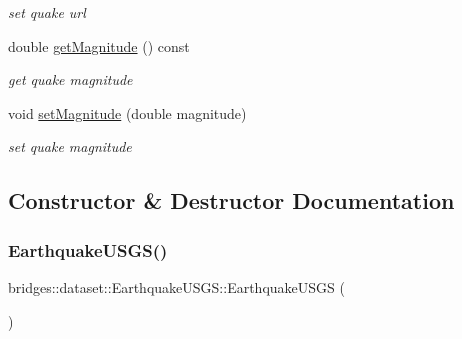 \begin{DoxyCompactItemize}
\begin{DoxyCompactList}\small\item\em set quake url \end{DoxyCompactList}\item 
double \mbox{\hyperlink{classbridges_1_1dataset_1_1_earthquake_u_s_g_s_aeb1be6b0dece1240da3123db9f9c2d9b}{get\+Magnitude}} () const
\begin{DoxyCompactList}\small\item\em get quake magnitude \end{DoxyCompactList}\item 
void \mbox{\hyperlink{classbridges_1_1dataset_1_1_earthquake_u_s_g_s_ab961fcafd63f3ec0626ff38e2c4c01cd}{set\+Magnitude}} (double magnitude)
\begin{DoxyCompactList}\small\item\em set quake magnitude \end{DoxyCompactList}\end{DoxyCompactItemize}


\subsection{Constructor \& Destructor Documentation}
\mbox{\label{classbridges_1_1dataset_1_1_earthquake_u_s_g_s_a2e89f6ef9b631c6b8315c696cee7fb53}} 
\subsubsection{\texorpdfstring{Earthquake\+U\+S\+G\+S()}{EarthquakeUSGS()}\hspace{0.1cm}{\footnotesize\ttfamily [1/3]}}
{\footnotesize\ttfamily bridges\+::dataset\+::\+Earthquake\+U\+S\+G\+S\+::\+Earthquake\+U\+S\+GS (\begin{DoxyParamCaption}{ }\end{DoxyParamCaption})\hspace{0.3cm}{\ttfamily [inline]}}

\mbox{\label{classbridges_1_1dataset_1_1_earthquake_u_s_g_s_a3bb03ca9f4c0a3c8ecbab5a90b1886f8}} 

